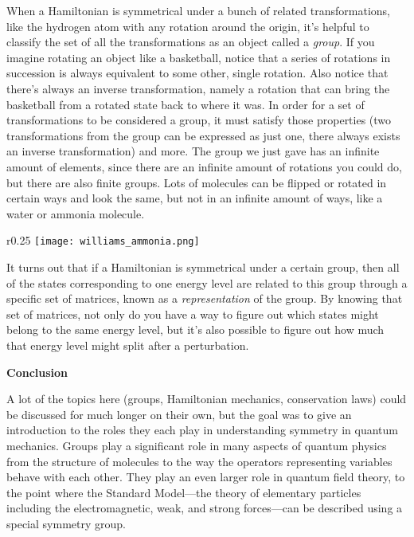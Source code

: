 When a Hamiltonian is symmetrical under a bunch of related transformations, like the hydrogen atom with any rotation around the origin, it's helpful to classify the set of all the transformations as an object called a \emph{group}. If you imagine rotating an object like a basketball, notice that a series of rotations in succession is always equivalent to some other, single rotation. Also notice that there's always an inverse transformation, namely a rotation that can bring the basketball from a rotated state back to where it was. In order for a set of transformations to be considered a group, it must satisfy those properties (two transformations from the group can be expressed as just one, there always exists an inverse transformation) and more. The group we just gave has an infinite amount of elements, since there are an infinite amount of rotations you could do, but there are also finite groups. Lots of molecules can be flipped or rotated in certain ways and look the same, but not in an infinite amount of ways, like a water or ammonia molecule.

\begin{wrapfigure}{r}{0.25\textwidth}
    \centering
    \texttt{[image: williams\_ammonia.png]}
\end{wrapfigure}

It turns out that if a Hamiltonian is symmetrical under a certain group, then all of the states corresponding to one energy level are related to this group through a specific set of matrices, known as a \emph{representation} of the group. By knowing that set of matrices, not only do you have a way to figure out which states might belong to the same energy level, but it's also possible to figure out how much that energy level might split after a perturbation.

\noindent
\textbf{Conclusion}

A lot of the topics here (groups, Hamiltonian mechanics, conservation laws) could be discussed for much longer on their own, but the goal was to give an introduction to the roles they each play in understanding symmetry in quantum mechanics. Groups play a significant role in many aspects of quantum physics from the structure of molecules to the way the operators representing variables behave with each other. They play an even larger role in quantum field theory, to the point where the Standard Model---the theory of elementary particles including the electromagnetic, weak, and strong forces---can be described using a special symmetry group. 

